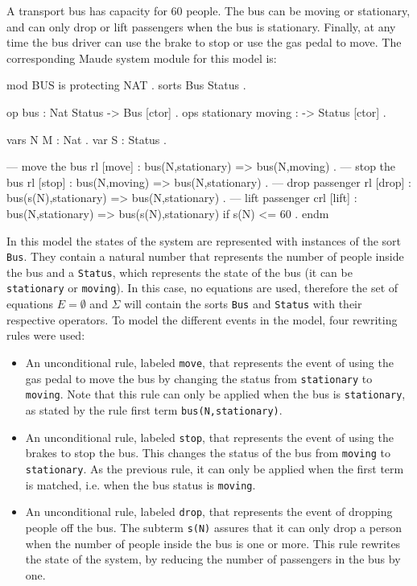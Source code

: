 \begin{example}
\normalfont
A transport bus has capacity for 60 people. The bus can be moving or stationary, and can only drop or lift passengers when the bus is stationary. Finally, at any time the bus driver can use the brake to stop or use the gas pedal to move. The corresponding Maude system module for this model is:
\\
\begin{maude}
mod BUS is protecting NAT .
  sorts Bus Status .

  op bus : Nat Status -> Bus [ctor] .
  ops stationary moving : -> Status [ctor] .
 
  vars N M : Nat . var S : Status .

  --- move the bus
  rl [move] : bus(N,stationary) => bus(N,moving) .
  --- stop the bus 
  rl [stop] : bus(N,moving) => bus(N,stationary) .
  --- drop passenger
  rl [drop] : bus(s(N),stationary) => bus(N,stationary) .
  --- lift passenger
  crl [lift] : bus(N,stationary) => bus(s(N),stationary) 
                                    if s(N) <= 60 . 
endm
\end{maude}
In this model the states of the system are represented with instances of the sort \texttt{Bus}. They contain a natural number that represents the number of people inside the bus and a \texttt{Status}, which represents the state of the bus (it can be \texttt{stationary} or \texttt{moving}). In this case, no equations are used, therefore the set of equations $E = \emptyset$  and $\Sigma$ will contain the sorts \texttt{Bus} and \texttt{Status} with their respective operators. To model the different events in the model, four rewriting rules were used:
\begin{itemize}
    \item An unconditional rule, labeled \texttt{move}, that represents the event of using the gas pedal to move the bus by changing the status from \texttt{stationary} to \texttt{moving}. Note that this rule can only be applied when the bus is \texttt{stationary}, as stated by the rule first term \texttt{bus(N,stationary)}.
    \item An unconditional rule, labeled \texttt{stop}, that represents the event of using the brakes to stop the bus. This changes the status of the bus from \texttt{moving} to \texttt{stationary}. As the previous rule, it can only be applied when the first term is matched, i.e. when the bus status is \texttt{moving}. 
    \item An unconditional rule, labeled \texttt{drop}, that represents the event of dropping people off the bus. The subterm \texttt{s(N)} assures that it can only drop a person when the number of people inside the bus is one or more. This rule rewrites the state of the system, by reducing the number of passengers in the bus by one.

\end{itemize}
\end{example}
